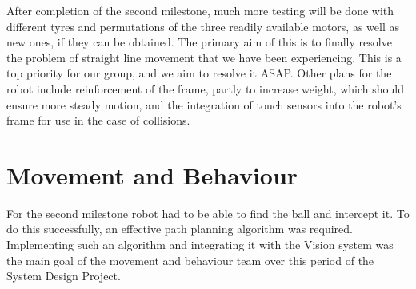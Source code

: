 \documentclass[conference,12pt]{IEEEtran}
\begin{document}
After completion of the second milestone, much more testing will be done with different tyres and permutations of the three readily available motors, as well as new ones, if they can be obtained. The primary aim of this is to finally resolve the problem of straight line movement that we have been experiencing. This is a top priority for our group, and we aim to resolve it ASAP. Other plans for the robot include reinforcement of the frame, partly to increase weight, which should ensure more steady motion, and the integration of touch sensors into the robot's frame for use in the case of collisions.
\vspace{-2 mm}
\section{Movement and Behaviour}
\vspace{-2 mm}
For the second milestone robot had to be able to find the ball and intercept it. To do this successfully, an effective path planning algorithm was required. Implementing such an algorithm and integrating it with the Vision system was the main goal of the movement and behaviour team over this period of the System Design Project.
\end{document}
